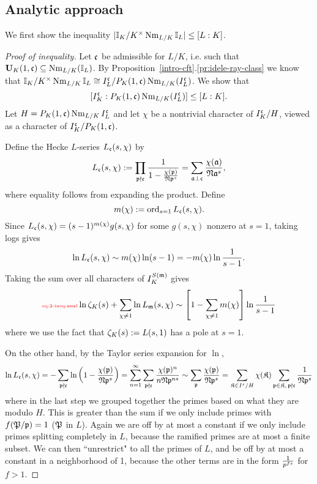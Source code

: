 \subsection{Analytic approach}
We first show the inequality $|\mathbb{I}_K/K^{\times}\operatorname{Nm}_{L/K}\mathbb{I}_L|\le [L:K]$.
\begin{proof}[Proof of inequality]
Let $\mathfrak{c}$ be admissible for $L/K$, i.e. such that $\mathbf U_K(1,\mathfrak{c})\subseteq \operatorname{Nm}_{L/K}(\mathbb{I}_L)$.
By Proposition~\ref{intro-cft}.\ref{pr:idele-ray-class} we know that $\mathbb{I}_K/K^{\times}\operatorname{Nm}_{L/K}\mathbb{I}_L\cong I_L^{\mathfrak{c}}/P_{K}(1,{\mathfrak{c}})\operatorname{Nm}_{L/K}(I_L^{\mathfrak{c}})$. We show that
\[
[I_K^{\mathfrak{c}}:P_K(1,{\mathfrak{c}})\operatorname{Nm}_{L/K}(I_L^{\mathfrak{c}})]\le [L:K].
\]
Let $H=P_K(1,{\mathfrak{c}})\operatorname{Nm}_{L/K}I_L^{\mathfrak{c}}$ and let $\chi$ be a nontrivial character of $I_K^{\mathfrak{c}}/H$, viewed as a character of $I_K^{\mathfrak{c}}/P_K(1,{\mathfrak{c}})$. 

Define the Hecke $L$-series $L_{\mathfrak{c}}(s,\chi)$ by
\[
L_{\mathfrak{c}}(s,\chi):=\prod_{\mathfrak{p}\nmid \mathfrak{c}} \frac{1}{1-\frac{\chi(\mathfrak{p})}{\mathfrak{N} \mathfrak{p}^s}}=\sum_{\mathfrak{a}\perp\mathfrak{c}}\frac{\chi(\mathfrak{a})}{\mathfrak{N}\mathfrak{a}^s},
\]
where equality follows from expanding the product.
Define
\[
m(\chi):=\operatorname{ord}_{s=1} L_{\mathfrak{c}}(s,\chi).
\]
Since $L_{\mathfrak{c}}(s,\chi)=(s-1)^{m(\chi)}g(s,\chi)$ for some $g(s,\chi)$ nonzero at $s=1$, taking logs gives
\[
\ln L_{\mathfrak{c}}(s,\chi)\sim m(\chi)\ln(s-1)=-m(\chi)\ln \frac{1}{s-1}.
\]
Taking the sum over all characters of $I_K^{S(\mathfrak{m})}$ gives
\begin{equation}\llabel{eq:2-ineq-anal}
\ln \ze_K(s)+\sum_{\chi\ne 1}\ln L_{\mm}(s,\chi)
\sim
\ba{1-\sum_{\chi\ne 1}m(\chi)}\ln\rc{s-1}
\end{equation}
where we use the fact that $\zeta_K(s):=L(s,1)$ has a pole at $s=1$.

On the other hand, by the Taylor series expansion for $\ln$,
\[
\ln L_{\mathfrak{c}}(s,\chi)=-\sum_{\mathfrak{p}\nmid \mathfrak{c}}^{}\ln \left( {1-\frac{\chi(\mathfrak{p})}{\mathfrak{N} \mathfrak{p}^s}} \right)=
\sum_{n=1}^{\infty}\sum_{\mathfrak{p}\nmid \mathfrak{c}} \frac{\chi(\mathfrak{p})^n}{n\mathfrak{N} \mathfrak{p}^{ns}}\sim\sum_{\mathfrak{p}}\frac{\chi(\mathfrak{p})}{\mathfrak{N} \mathfrak{p}^s}
=
\sum_{\mathfrak K\in I^{\mathfrak{c}}/H} \chi(\mathfrak K)\sum_{\mathfrak{p}\in \mathfrak K,\,\mathfrak{p}\nmid \mathfrak{c}}\frac{1}{\mathfrak{N}\mathfrak{p}^s}
\]
where in the last step we grouped together the primes based on what they are modulo $H$. This is greater than the sum if we only include primes with $f(\mathfrak{P}/\mathfrak{p})=1$ ($\mathfrak{P}$ in $L$). %
Again we are off by at most a constant if we only include primes splitting completely in $L$, because the ramified primes are at most a finite subset. 
We can then ``unrestrict" to all the primes of $L$, and be off by at most a constant in a neighborhood of 1, because the other terms are in the form $\frac{1}{p^{fs}}$ for $f>1$.


\end{proof}
